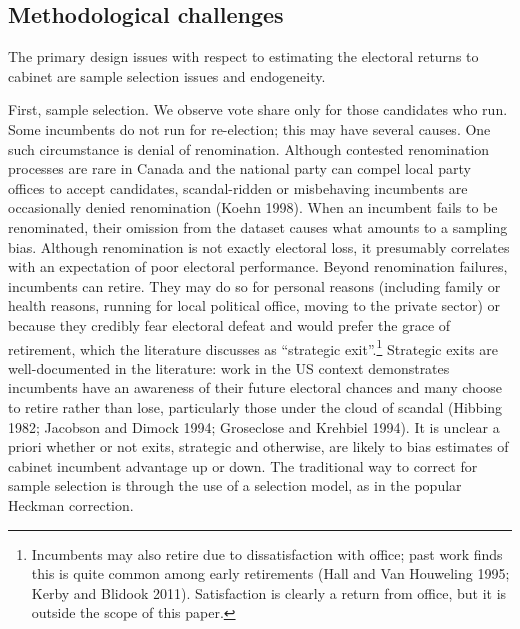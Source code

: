 \documentclass[letter,12pt]{article}
\begin{document}
\subsection*{Methodological challenges}
The primary design issues with respect to estimating the electoral returns to cabinet are sample selection issues and endogeneity.

First, sample selection. We observe vote share only for those candidates who run. Some incumbents do not run for re-election; this may have several causes. One such circumstance is denial of renomination. Although contested renomination processes are rare in Canada and the national party can compel local party offices to accept candidates, scandal-ridden or misbehaving incumbents are occasionally denied renomination (Koehn 1998). When an incumbent fails to be renominated, their omission from the dataset causes what amounts to a sampling bias. Although renomination is not exactly electoral loss, it presumably correlates with an expectation of poor electoral performance. Beyond renomination failures, incumbents can retire. They may do so for personal reasons (including family or health reasons, running for local political office, moving to the private sector) or because they credibly fear electoral defeat and would prefer the grace of retirement, which the literature discusses as ``strategic exit''.\footnote{Incumbents may also retire due to dissatisfaction with office; past work finds this is quite common among early retirements (Hall and Van Houweling 1995; Kerby and Blidook 2011). Satisfaction is clearly a return from office, but it is outside the scope of this paper.} Strategic exits are well-documented in the literature: work in the US context demonstrates incumbents have an awareness of their future electoral chances and many choose to retire rather than lose, particularly those under the cloud of scandal (Hibbing 1982; Jacobson and Dimock 1994; Groseclose and Krehbiel 1994). It is unclear a priori whether or not exits, strategic and otherwise, are likely to bias estimates of cabinet incumbent advantage up or down. The traditional way to correct for sample selection is through the use of a selection model, as in the popular Heckman correction.
\end{document}
